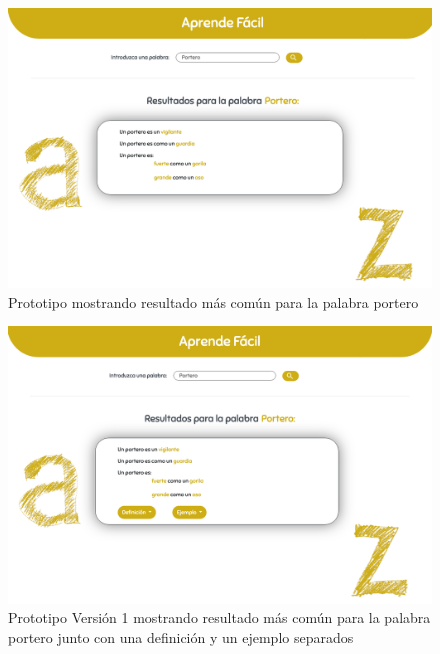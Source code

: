 
	\begin{figure}[!t]
		\includegraphics[width=.8\textwidth]{Imagenes/Bitmap/Mockups/mockup1_irene_final.png}
		\centering
		\caption{Prototipo mostrando resultado más común para la palabra portero}
		\label{fig:mockup1irene_vFinal}
	\end{figure}

	\begin{figure}[!t]
	\includegraphics[width=.8\textwidth]{Imagenes/Bitmap/Mockups/mockup2_irene_final_v1.png}
	\centering
	\caption{Prototipo Versión 1 mostrando resultado más común para la palabra portero junto con una definición y un ejemplo separados}
	\label{fig:mockup2irene_v1_vFinal}
	\end{figure}
	 
